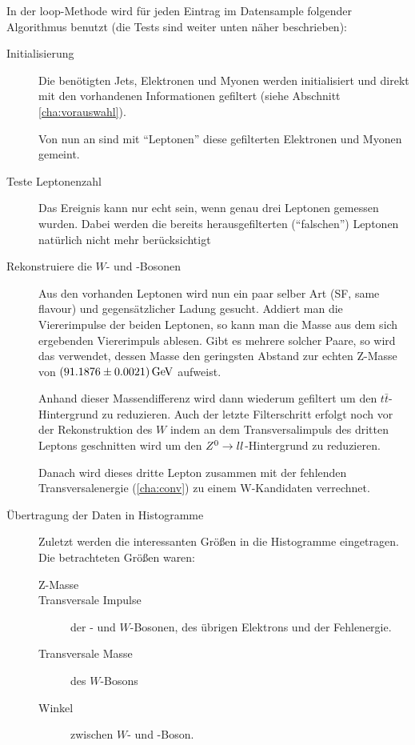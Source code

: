In der loop-Methode wird für jeden Eintrag im Datensample folgender Algorithmus
benutzt (die Tests sind weiter unten näher beschrieben):
\begin{description}
  \item[Initialisierung] Die benötigten Jets, Elektronen und Myonen werden
    initialisiert und direkt mit den vorhandenen Informationen gefiltert (siehe
    Abschnitt \ref{cha:vorauswahl}).

    Von nun an sind mit "`Leptonen"' diese gefilterten Elektronen und Myonen
    gemeint.

  \item[Teste Leptonenzahl] Das Ereignis kann nur echt sein, wenn genau drei
    Leptonen gemessen wurden. Dabei werden die bereits herausgefilterten
    ("`falschen"') Leptonen natürlich nicht mehr berücksichtigt
    
  \item[Rekonstruiere die $W$- und \Z-Bosonen] Aus den vorhanden Leptonen wird nun
    ein paar selber Art (SF, same flavour) und gegensätzlicher Ladung gesucht.
    Addiert man die Viererimpulse der beiden Leptonen, so kann man die Masse aus
    dem sich ergebenden Viererimpuls ablesen. Gibt es mehrere solcher Paare, so
    wird das verwendet, dessen Masse den geringsten Abstand zur echten Z-Masse
    von $\unit[(91.1876 \pm 0.0021)]{GeV}$\cite{pdg-booklet} aufweist.

    Anhand dieser Massendifferenz wird dann wiederum gefiltert um den
    $t\bar{t}$-Hintergrund zu reduzieren. Auch der letzte Filterschritt erfolgt
    noch vor der Rekonstruktion des $W$ indem an dem Transversalimpuls des
    dritten Leptons geschnitten wird um den $Z^0\to ll$-Hintergrund zu
    reduzieren.

    Danach wird dieses dritte Lepton zusammen mit der fehlenden
    Transversalenergie (\ref{cha:conv}) zu einem W-Kandidaten verrechnet.

  \item[Übertragung der Daten in Histogramme] Zuletzt werden die interessanten
    Größen in die Histogramme eingetragen. Die betrachteten Größen waren:
    \begin{description}
      \item[Z-Masse]
      \item[Transversale Impulse] der \Z- und $W$-Bosonen, des übrigen Elektrons
        und der Fehlenergie.
      \item[Transversale Masse] des $W$-Bosons
      \item[Winkel] zwischen $W$- und \Z-Boson.
    \end{description}
\end{description}

